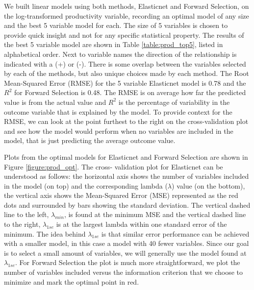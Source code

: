 \documentclass{article}
\begin{document}
We built linear models using both methods, Elasticnet and Forward Selection, on the log-transformed 
productivity variable, recording an optimal model of any size and the best 5 variable model for each. The size of 5 variables is 
chosen to provide quick insight and not for any specific statistical property. The results of the best 5 variable model are shown 
in Table \ref{table:prod_top5}, listed in alphabetical order.  Next to variable names the direction of the relationship is indicated 
with a (+) or (-). There is some overlap between the variables selected by each of the methods, but also unique choices made 
by each method. The Root Mean-Squared Error (RMSE) for the 5 variable Elasticnet model is 0.78 and the $R^2$ for 
Forward Selection is 0.48. The RMSE is on average how far the predicted value is from the actual value and $R^2$ is the 
percentage of variability in the outcome variable that is explained by the model. To provide context for the RMSE, we can look 
at the point furthest to the right on the cross-validation plot and see how the model would perform when no variables are 
included in the model, that is just predicting the average outcome value.


Plots from the optimal models for Elasticnet and Forward Selection are shown in Figure \ref{figure:prod_opt}. The cross-
validation plot for Elasticnet can be understood as follows: the 
horizontal axis shows the number of variables included in the model (on top) and the corresponding lambda ($\lambda$) value 
(on the bottom), the vertical axis shows the Mean-Squared Error (MSE) represented as the red dots and surrounded by bars 
showing the standard deviation. The vertical dashed line to the left, $\lambda_{min}$, is found at the minimum MSE and the 
vertical dashed line to the right, $\lambda_{1se}$ is at the largest lambda within one standard error of the minimum. The idea 
behind $\lambda_{1se}$ is that similar error performance can be achieved with a smaller model, in this case a model with 40 
fewer variables. Since our goal is to select a small amount of variables, we will generally use the model found at $
\lambda_{1se}$. For Forward Selection the plot is much more straightforward, we plot the number of variables included versus 
the information criterion that we choose to minimize and mark the optimal point in red.
\end{document}
